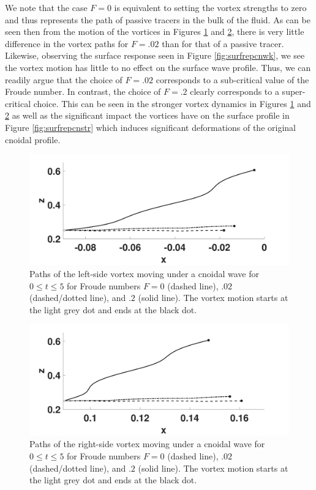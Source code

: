 \documentclass[a4paper,11pt]{article}
\begin{document}
We note that the case $F=0$ is equivalent to setting the vortex strengths to zero and thus represents the path of passive tracers in the bulk of the fluid.  As can be seen then from the motion of the vortices in Figures \ref{fig:cnltrack} and \ref{fig:cnrtrack}, there is very little difference in the vortex paths for $F=.02$ than for that of a passive tracer.  Likewise, observing the surface response seen in Figure \ref{fig:surfrepcnwk}, we see the vortex motion has little to no effect on the surface wave profile.  Thus, we can readily argue that the choice of $F=.02$ corresponds to a sub-critical value of the Froude number.  In contrast, the choice of $F=.2$ clearly corresponds to a super-critical choice.  This can be seen in the stronger vortex dynamics in Figures \ref{fig:cnltrack}  and \ref{fig:cnrtrack} as well as the significant impact the vortices have on the surface profile in Figure \ref{fig:surfrepcnstr} which induces significant deformations of the original cnoidal profile.   
\begin{figure}[!h]
\centering
\includegraphics[width=.75\textwidth]{leftside_cnoid_tracks}
\caption{Paths of the left-side vortex moving under a cnoidal wave for $0\leq t \leq 5$ for Froude numbers $F=0$ (dashed line), $.02$ (dashed/dotted line), and $.2$ (solid line).  The vortex motion starts at the light grey dot and ends at the black dot.}
\label{fig:cnltrack}
\end{figure}
\begin{figure}[!h]
\centering
\includegraphics[width=.75\textwidth]{rightside_cnoid_tracks}
\caption{Paths of the right-side vortex moving under a cnoidal wave for $0\leq t \leq 5$ for Froude numbers $F=0$ (dashed line), $.02$ (dashed/dotted line), and $.2$ (solid line).  The vortex motion starts at the light grey dot and ends at the black dot.}
\label{fig:cnrtrack}
\end{figure}
\end{document}
